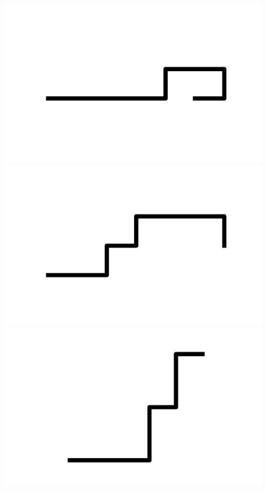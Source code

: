 \documentclass[]{report}
\begin{document}
\includegraphics[scale=.1]{pictures/21/state_cluster_shapes_67.pdf} 
\includegraphics[scale=.1]{pictures/21/state_cluster_shapes_68.pdf} 
\includegraphics[scale=.1]{pictures/21/state_cluster_shapes_69.pdf} 
\end{document}
